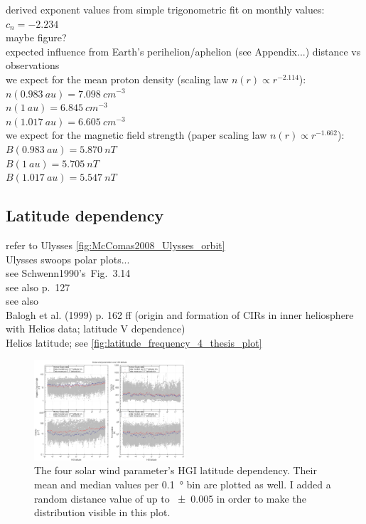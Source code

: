 derived exponent values from simple trigonometric fit on monthly values:\\
$c_n = -2.234$\\
maybe figure?\\

expected influence from Earth's perihelion/aphelion (see Appendix...) distance vs observations\\
we expect for the mean proton density (scaling law $n(r) \propto r^{-2.114}$):\\
$n(0.983~au) = 7.098~cm^{-3}$\\
$n(1~au) = 6.845~cm^{-3}$\\
$n(1.017~au) = 6.605~cm^{-3}$\\
we expect for the magnetic field strength (paper scaling law $n(r) \propto r^{-1.662}$):\\
$B(0.983~au) = 5.870~nT$\\
$B(1~au) = 5.705~nT$\\
$B(1.017~au) = 5.547~nT$\\


\subsection{Latitude dependency}
refer to Ulysses \autoref{fig:McComas2008_Ulysses_orbit}\\
Ulysses swoops polar plots...\\

see Schwenn1990's~Fig.~3.14\\
see also \citet{Schwenn1990} p.~127\\
see also \citet{Richardson1995}\\
Balogh et al. (1999) p. 162 ff (origin and formation of CIRs in inner heliosphere with Helios data; latitude V dependence)\\

Helios latitude; see \autoref{fig:latitude_frequency_4_thesis_plot}
\begin{figure}[htb]
	\centering
	\includegraphics[width=0.5\textwidth]{figures_of_mine/gnuplots/latitude_frequency_4_thesis_plot.png}
	\caption{The four solar wind parameter's HGI latitude dependency. Their mean and median values per \SI{0.1}{\degree} bin are plotted as well. I added a random distance value of up to \SI{+-0.005}{\au} in order to make the distribution visible in this plot.}
	\label{fig:latitude_frequency_4_thesis_plot}
\end{figure}

